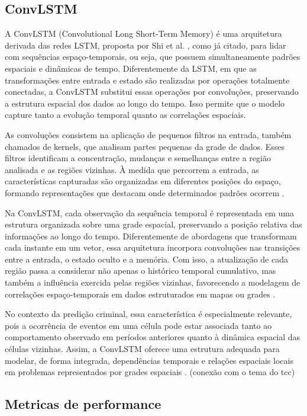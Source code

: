 \subsection{ConvLSTM}

A ConvLSTM (Convolutional Long Short-Term Memory) é uma arquitetura derivada das redes LSTM, proposta por Shi et al. \cite{shi2015}, como já citado, para lidar com sequências espaço-temporais, ou seja, que possuem simultaneamente padrões espaciais e dinâmicas de tempo. Diferentemente da LSTM, em que as transformações entre entrada e estado são realizadas por operações totalmente conectadas, a ConvLSTM substitui essas operações por convoluções, preservando a estrutura espacial dos dados ao longo do tempo. Isso permite que o modelo capture tanto a evolução temporal quanto as correlações espaciais. 

As convoluções consistem na aplicação de pequenos filtros na entrada, também chamados de kernels, que analisam partes pequenas da grade de dados. Esses filtros identificam a concentração, mudanças e semelhanças entre a região analisada e as regiões vizinhas. À medida que percorrem a entrada, as características capturadas são organizadas em diferentes posições do espaço, formando representações que destacam onde determinados padrões ocorrem \cite{lecun1998}. 

Na ConvLSTM, cada observação da sequência temporal é representada em uma estrutura organizada sobre uma grade espacial, preservando a posição relativa das informações ao longo do tempo. Diferentemente de abordagens que transformam cada instante em um vetor, essa arquitetura incorpora convoluções nas transições entre a entrada, o estado oculto e a memória. Com isso, a atualização de cada região passa a considerar não apenas o histórico temporal cumulativo, mas também a influência exercida pelas regiões vizinhas, favorecendo a modelagem de correlações espaço-temporais em dados estruturados em mapas ou grades \cite{shi2015,shi2017}.

No contexto da predição criminal, essa característica é especialmente relevante, pois a ocorrência de eventos em uma célula pode estar associada tanto ao comportamento observado em períodos anteriores quanto à dinâmica espacial das células vizinhas. Assim, a ConvLSTM oferece uma estrutura adequada para modelar, de forma integrada, dependências temporais e relações espaciais locais em problemas representados por grades espaciais \cite{shi2015}. (conexão com o tema do tcc)

\subsection{Metricas de performance}


